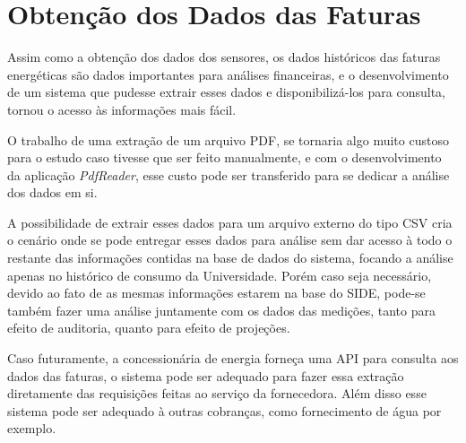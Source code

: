 \chapter {Obtenção dos Dados das Faturas}
\label{c:obtencao_dos_dados_das_faturas}

Assim como a obtenção dos dados dos sensores, os dados históricos das faturas energéticas são dados importantes para análises financeiras, e o desenvolvimento de um sistema que pudesse extrair esses dados e disponibilizá-los para consulta, tornou o acesso às informações mais fácil.

O trabalho de uma extração de um arquivo PDF, se tornaria algo muito custoso para o estudo caso tivesse que ser feito manualmente, e com o desenvolvimento da aplicação \textit{PdfReader}, esse custo pode ser transferido para se dedicar a análise dos dados em si. 

A possibilidade de extrair esses dados para um arquivo externo do tipo CSV cria o cenário onde se pode entregar esses dados para análise sem dar acesso à todo o restante das informações contidas na base de dados do sistema, focando a análise apenas no histórico de consumo da Universidade. Porém caso seja necessário, devido ao fato de as mesmas informações estarem na base do SIDE, pode-se também fazer uma análise juntamente com os dados das medições, tanto para efeito de auditoria, quanto para efeito de projeções.

Caso futuramente, a concessionária de energia forneça uma API para consulta aos dados das faturas, o sistema pode ser adequado para fazer essa extração diretamente das requisições feitas ao serviço da fornecedora. Além disso esse sistema pode ser adequado à outras cobranças, como fornecimento de água por exemplo.